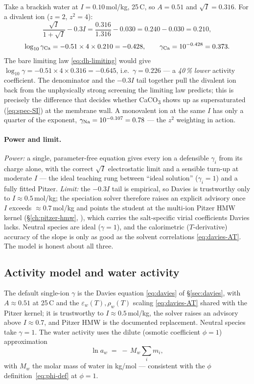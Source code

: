 \documentclass[11pt,a4paper]{article}
\begin{document}
\begin{example}
Take a brackish water at $I=0.10$\,mol/kg, 25\,\textdegree C, so
$A=0.51$ and $\sqrt I=0.316$.  For a divalent ion ($z=2$, $z^2=4$):
\[
   \frac{\sqrt I}{1+\sqrt I}-0.3I
   = \frac{0.316}{1.316}-0.030 = 0.240-0.030 = 0.210,
\]
\[
   \log_{10}\gamma_{\rm Ca} = -0.51\times 4 \times 0.210 = -0.428,
   \qquad \gamma_{\rm Ca}=10^{-0.428}=0.373.
\]
The bare limiting law \eqref{eq:dh-limiting} would give
$\log_{10}\gamma=-0.51\times4\times0.316=-0.645$, i.e.\
$\gamma=0.226$ --- a \emph{40\,\% lower} activity coefficient.  The
denominator and the $-0.3I$ tail together pull the divalent ion back
from the unphysically strong screening the limiting law predicts; this
is precisely the difference that decides whether CaCO\textsubscript{3}
shows up as supersaturated (\eqref{eq:spec-SI}) at the membrane wall.
A monovalent ion at the same $I$ has only a quarter of the exponent,
$\gamma_{\rm Na}=10^{-0.107}=0.78$ --- the $z^2$ weighting in action.
\end{example}

\paragraph{Power and limit.}  \emph{Power:} a single, parameter-free
equation gives every ion a defensible $\gamma_i$ from its charge alone,
with the correct $\sqrt I$ electrostatic limit and a sensible turn-up at
moderate $I$ --- the ideal teaching rung between ``ideal solution''
($\gamma_i=1$) and a fully fitted Pitzer.  \emph{Limit:} the $-0.3I$ tail
is empirical, so Davies is trustworthy only to $I\approx 0.5$\,mol/kg;
the speciation solver therefore raises an explicit advisory once
$I$ exceeds $\approx 0.7$\,mol/kg and points the student at the
multi-ion Pitzer HMW kernel (\S\ref{ch:pitzer-hmw},
\cite{Pitzer1973}), which carries the salt-specific virial coefficients
Davies lacks.  Neutral species are ideal ($\gamma=1$), and the
calorimetric ($T$-derivative) accuracy of the slope is only as good as
the solvent correlations \eqref{eq:davies-AT}.  The model is honest about
all three.

\subsection{Activity model and water activity}

The default single-ion $\gamma$ is the Davies equation
\eqref{eq:davies} of \S\ref{sec:davies}, with $A\approx 0.51$ at
25\,\textdegree C and the $\varepsilon_w(T),\rho_w(T)$ scaling
\eqref{eq:davies-AT} shared with the Pitzer kernel; it is trustworthy to
$I\approx 0.5$\,mol/kg, the solver raises an advisory above $I\approx
0.7$, and Pitzer HMW \cite{Pitzer1973} is the documented replacement.
Neutral species take $\gamma=1$.  The water activity uses the dilute
(osmotic coefficient $\phi=1$) approximation
\begin{equation}
   \ln a_w \;=\; -\,M_w\sum_i m_i,
   \label{eq:spec-aw}
\end{equation}
with $M_w$ the molar mass of water in kg/mol --- consistent with the
$\phi$ definition~\eqref{eq:phi-def} at $\phi=1$.
\end{document}
